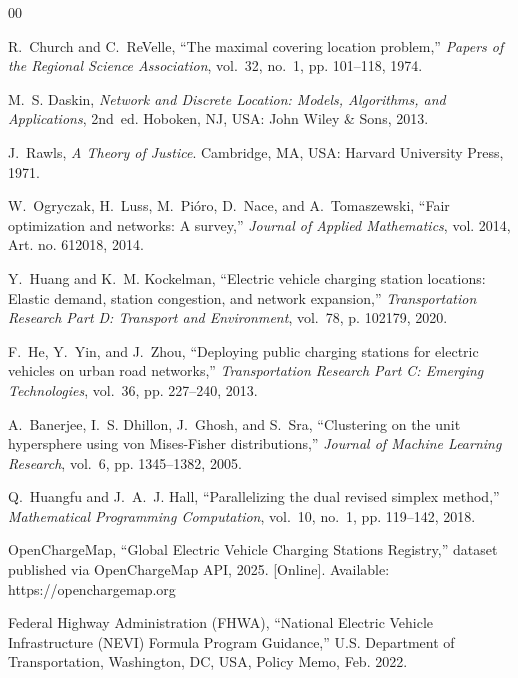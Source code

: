\documentclass[conference]{IEEEtran}
\begin{document}
\begin{thebibliography}{00}

R.~Church and C.~ReVelle, ``The maximal covering location problem,'' \emph{Papers of the Regional Science Association}, vol.~32, no.~1, pp. 101--118, 1974.

M.~S. Daskin, \emph{Network and Discrete Location: Models, Algorithms, and Applications}, 2nd~ed. Hoboken, NJ, USA: John Wiley \& Sons, 2013.

J.~Rawls, \emph{A Theory of Justice}. Cambridge, MA, USA: Harvard University Press, 1971.

W.~Ogryczak, H.~Luss, M.~Pi{\'o}ro, D.~Nace, and A.~Tomaszewski, ``Fair optimization and networks: A survey,'' \emph{Journal of Applied Mathematics}, vol. 2014, Art. no. 612018, 2014.

Y.~Huang and K.~M. Kockelman, ``Electric vehicle charging station locations: Elastic demand, station congestion, and network expansion,'' \emph{Transportation Research Part D: Transport and Environment}, vol.~78, p. 102179, 2020.

F.~He, Y.~Yin, and J.~Zhou, ``Deploying public charging stations for electric vehicles on urban road networks,'' \emph{Transportation Research Part C: Emerging Technologies}, vol.~36, pp. 227--240, 2013.

A.~Banerjee, I.~S. Dhillon, J.~Ghosh, and S.~Sra, ``Clustering on the unit hypersphere using von Mises-Fisher distributions,'' \emph{Journal of Machine Learning Research}, vol.~6, pp. 1345--1382, 2005.

Q.~Huangfu and J.~A.~J. Hall, ``Parallelizing the dual revised simplex method,'' \emph{Mathematical Programming Computation}, vol.~10, no.~1, pp. 119--142, 2018.

OpenChargeMap, ``Global Electric Vehicle Charging Stations Registry,'' dataset published via OpenChargeMap API, 2025. [Online]. Available: https://openchargemap.org

Federal Highway Administration (FHWA), ``National Electric Vehicle Infrastructure (NEVI) Formula Program Guidance,'' U.S. Department of Transportation, Washington, DC, USA, Policy Memo, Feb. 2022.

\end{thebibliography}
\end{document}
